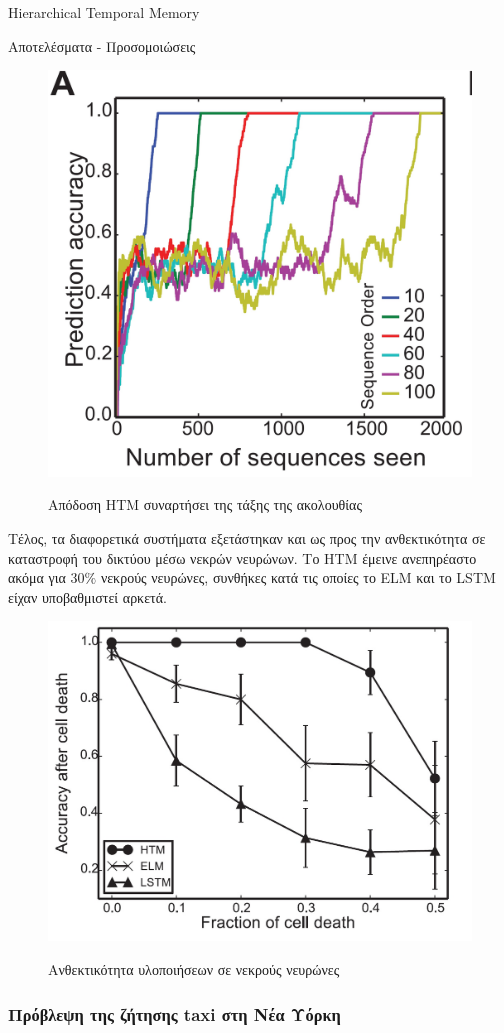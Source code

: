 \documentclass[a4paper,11pt]{article}
\begin{document}
\begin{section}{Hierarchical Temporal Memory}
\begin{subsection}{Αποτελέσματα - Προσομοιώσεις}
    \begin{figure}[H]
      \centering%
      {\includegraphics[width=0.4\columnwidth,clip=true]{pics/sequence_order.jpg}}
      \caption{Απόδοση HTM συναρτήσει της τάξης της ακολουθίας} \label{fig:sequence-order}
    \end{figure}
    Τέλος, τα διαφορετικά συστήματα εξετάστηκαν και ως προς την ανθεκτικότητα σε καταστροφή του δικτύου μέσω νεκρών νευρώνων. Το HTM έμεινε ανεπηρέαστο ακόμα για $30\%$ νεκρούς νευρώνες, συνθήκες κατά τις οποίες το ELM και το LSTM είχαν υποβαθμιστεί αρκετά.
    \begin{figure}[H]
      \centering%
      {\includegraphics[width=0.4\columnwidth,clip=true]{pics/cell_death.jpg}}
      \caption{Ανθεκτικότητα υλοποιήσεων σε νεκρούς νευρώνες} \label{fig:cell-death}
    \end{figure}


    \subsubsection{Πρόβλεψη της ζήτησης taxi στη Νέα Υόρκη}


\end{subsection}
\end{section}
\end{document}
